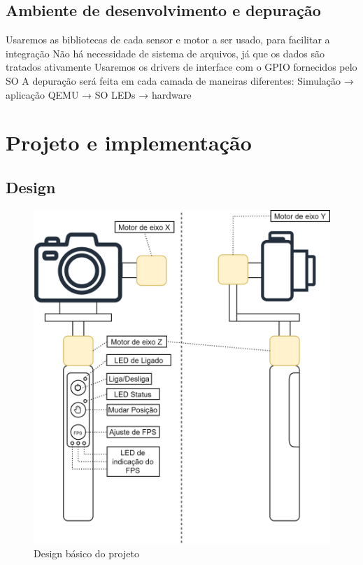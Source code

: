 \subsection{Ambiente de desenvolvimento e depuração}
Usaremos as bibliotecas de cada sensor e motor a ser usado, para facilitar a integração
Não há necessidade de sistema de arquivos, já que os dados são tratados ativamente
Usaremos os drivers de interface com o GPIO fornecidos pelo SO
A depuração será feita em cada camada de maneiras diferentes: 
Simulação → aplicação 
QEMU → SO 
LEDs → hardware 

\section{Projeto e implementação}

\subsection{Design}

\begin{figure}[H]
    \centering
    \includegraphics[width=1\textwidth,angle=0]{figures/Design-Page-1.png}
    \caption{Design básico do projeto}
    \label{fig:design_basico}
\end{figure}

